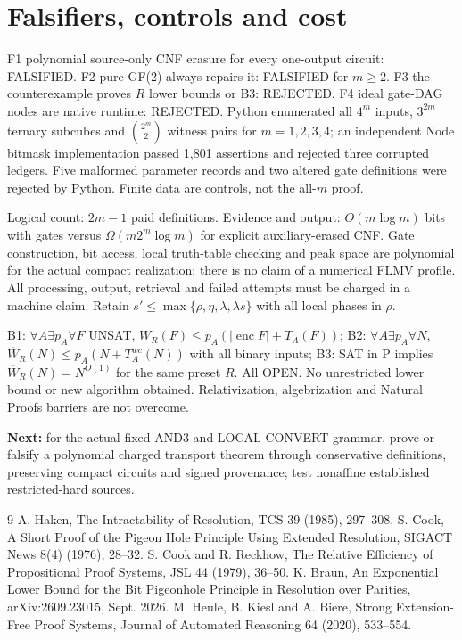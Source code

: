 \documentclass[11pt]{article}
\begin{document}
\section*{Falsifiers, controls and cost}
F1 polynomial source-only CNF erasure for every one-output circuit: FALSIFIED. F2 pure GF(2) always repairs it: FALSIFIED for $m\ge2$. F3 the counterexample proves $R$ lower bounds or B3: REJECTED. F4 ideal gate-DAG nodes are native runtime: REJECTED. Python enumerated all $4^m$ inputs, $3^{2m}$ ternary subcubes and $\binom{2^m}{2}$ witness pairs for $m=1,2,3,4$; an independent Node bitmask implementation passed 1,801 assertions and rejected three corrupted ledgers. Five malformed parameter records and two altered gate definitions were rejected by Python. Finite data are controls, not the all-$m$ proof.
\par Logical count: $2m-1$ paid definitions. Evidence and output: $O(m\log m)$ bits with gates versus $\Omega(m2^m\log m)$ for explicit auxiliary-erased CNF. Gate construction, bit access, local truth-table checking and peak space are polynomial for the actual compact realization; there is no claim of a numerical FLMV profile. All processing, output, retrieval and failed attempts must be charged in a machine claim. Retain $s'\le\max\{\rho,\eta,\lambda,\lambda s\}$ with all local phases in $\rho$.
\par B1: $\forall A\exists p_A\forall F$ UNSAT, $W_R(F)\le p_A(|\operatorname{enc}F|+T_A(F))$; B2: $\forall A\exists p_A\forall N$, $\overline W_R(N)\le p_A(N+T_A^{wc}(N))$ with all binary inputs; B3: SAT in P implies $\overline W_R(N)=N^{O(1)}$ for the same preset $R$. All OPEN. No unrestricted lower bound or new algorithm obtained. Relativization, algebrization and Natural Proofs barriers are not overcome.
\par \textbf{Next:} for the actual fixed AND3 and LOCAL-CONVERT grammar, prove or falsify a polynomial charged transport theorem through conservative definitions, preserving compact circuits and signed provenance; test nonaffine established restricted-hard sources. 
\begin{thebibliography}{9}
 A. Haken, The Intractability of Resolution, TCS 39 (1985), 297--308.
 S. Cook, A Short Proof of the Pigeon Hole Principle Using Extended Resolution, SIGACT News 8(4) (1976), 28--32.
 S. Cook and R. Reckhow, The Relative Efficiency of Propositional Proof Systems, JSL 44 (1979), 36--50.
 K. Braun, An Exponential Lower Bound for the Bit Pigeonhole Principle in Resolution over Parities, arXiv:2609.23015, Sept. 2026.
 M. Heule, B. Kiesl and A. Biere, Strong Extension-Free Proof Systems, Journal of Automated Reasoning 64 (2020), 533--554.
\end{thebibliography}
\end{document}
